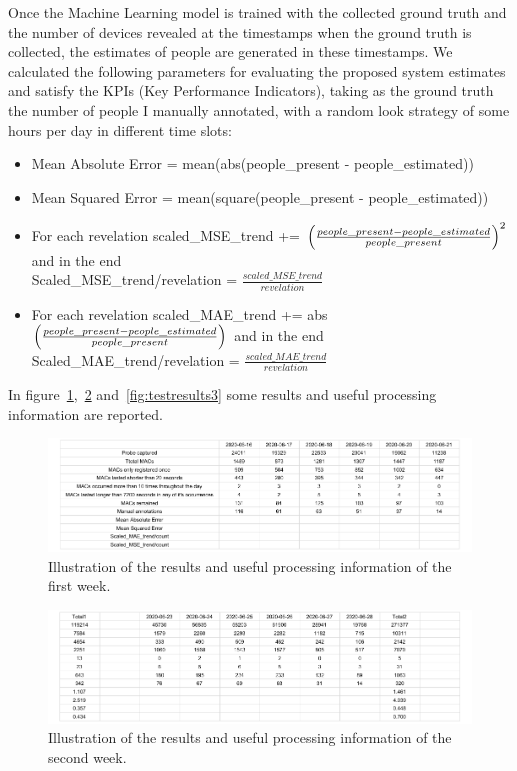 Once the Machine Learning model is trained with the collected ground truth and the number of devices revealed at the timestamps when the ground truth is collected, the estimates of people are generated in these timestamps. We calculated the following parameters for evaluating the proposed system estimates and satisfy the KPIs (Key Performance Indicators), taking as the ground truth the number of people I manually annotated, with a random look strategy of some hours per day in different time slots:
\begin{itemize}
  \item Mean Absolute Error = mean(abs(people\_present - people\_estimated))
  \item Mean Squared Error = mean(square(people\_present - people\_estimated))
  \item For each revelation scaled\_MSE\_trend += $\Bigl(\frac{people\_present - people\_estimated}{people\_present} \Bigr)^{2}$ and in the end\\Scaled\_MSE\_trend/revelation = $\frac{scaled\_MSE\_trend}{revelation}$
  \item For each revelation scaled\_MAE\_trend += abs$\Bigl(\frac{people\_present - people\_estimated}{people\_present} \Bigr)$ and in the end\\Scaled\_MAE\_trend/revelation = $\frac{scaled\_MAE\_trend}{revelation}$
\end{itemize}

In figure~\ref{fig:testresults1},~\ref{fig:testresults2} and~\ref{fig:testresults3} some results and useful processing information are reported.

\begin{figure}[h]
\centering 
\includegraphics[width=1\textwidth]{images/testresults1} 
\caption{Illustration of the results and useful processing information of the first week.}
\label{fig:testresults1}
\end{figure}

\begin{figure}[h]
\centering 
\includegraphics[width=1\textwidth]{images/testresults2} 
\caption{Illustration of the results and useful processing information of the second week.}
\label{fig:testresults2}
\end{figure}

